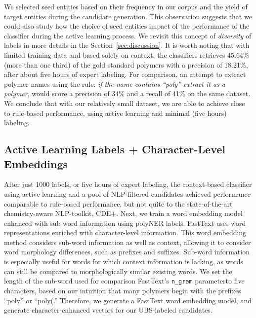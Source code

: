 We selected seed entities based on their frequency in our corpus and the yield of target entities during the candidate generation.
This observation suggests that we could also study how the choice of seed entities impact of the performance of the classifier during the active learning process. 
We revisit this concept of \textit{diversity} of labels in more details in the Section~\ref{sec:discussion}. 
It is worth noting that with limited training data and based solely on context, the classifiers retrieves 45.64\% (more than one third) of the gold standard polymers with a precision of 18.21\%, after about five hours of expert labeling. 
For comparison, an attempt to extract polymer names using the rule: \textit{if the name contains ``poly'' extract it as a polymer}, would score a precision of 34\% and a recall of 41\% on the same dataset.
We conclude that with our relatively small dataset, we are able to achieve close to rule-based performance, 
using active learning and minimal (five hours) labeling.

\subsection{Active Learning Labels + Character-Level Embeddings}
After just 1000 labels, or five hours of expert labeling, the context-based classifier using active learning and a pool of NLP-filtered candidates achieved performance comparable to rule-based performance, 
but not quite to the state-of-the-art chemistry-aware NLP-toolkit, CDE+.
Next, we train a word embedding model enhanced with sub-word information using polyNER labels. 
FastText uses word representations enriched with character-level information.
This word embedding method considers sub-word information as well as
context, allowing it to consider word morphology differences, such as prefixes
and suffixes. Sub-word information is especially useful for words for which
context information is lacking, as words can still be compared to morphologically similar
existing words. We set the length of the sub-word used for comparison\textemdash
FastText's \texttt{n_gram} parameter\textemdash to five characters, based on our intuition that
many polymers begin with the prefixes ``poly'' or ``poly(.'' 
Therefore, we generate a FastText word embedding model, 
and generate character-enhanced vectors for our UBS-labeled candidates.

